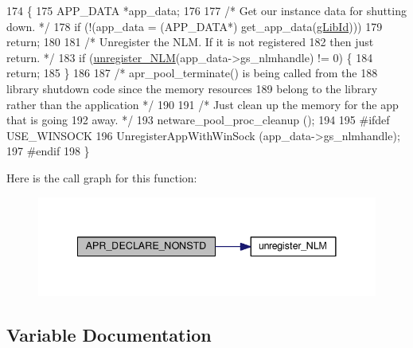 \begin{DoxyCode}
174 \{
175     APP\_DATA *app\_data;
176 
177     \textcolor{comment}{/* Get our instance data for shutting down. */}
178     \textcolor{keywordflow}{if} (!(app\_data = (APP\_DATA*) get\_app\_data(\hyperlink{srclib_2apr_2misc_2netware_2libprews_8c_a46b9eb87e97061bade6fd03e5004ebda}{gLibId})))
179         \textcolor{keywordflow}{return};
180 
181     \textcolor{comment}{/* Unregister the NLM. If it is not registered}
182 \textcolor{comment}{        then just return. */}
183     \textcolor{keywordflow}{if} (\hyperlink{srclib_2apr_2misc_2netware_2libprews_8c_a95d95c17e812246ac381d1e59010d0b7}{unregister\_NLM}(app\_data->gs\_nlmhandle) != 0) \{
184         \textcolor{keywordflow}{return};
185     \}
186 
187     \textcolor{comment}{/* apr\_pool\_terminate() is being called from the }
188 \textcolor{comment}{        library shutdown code since the memory resources}
189 \textcolor{comment}{        belong to the library rather than the application */}
190 
191     \textcolor{comment}{/* Just clean up the memory for the app that is going}
192 \textcolor{comment}{        away. */}
193     netware\_pool\_proc\_cleanup ();
194 
195 \textcolor{preprocessor}{#ifdef USE\_WINSOCK}
196     UnregisterAppWithWinSock (app\_data->gs\_nlmhandle);
197 \textcolor{preprocessor}{#endif}
198 \}
\end{DoxyCode}


Here is the call graph for this function\+:
\nopagebreak
\begin{figure}[H]
\begin{center}
\leavevmode
\includegraphics[width=341pt]{group__apr__library_gac8b5703810f2f9398da0ee2ef448aced_cgraph}
\end{center}
\end{figure}




\subsection{Variable Documentation}
